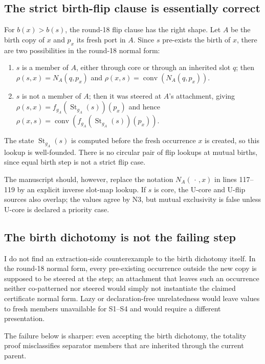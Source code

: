 \documentclass[11pt]{article}
\newcommand{\St}{\operatorname{St}}
\newcommand{\rhoR}{\rho}
\theoremstyle{remark}
\begin{document}
\subsection{The strict birth-flip clause is essentially correct}

For $b(x)>b(s)$, the round-18 flip clause has the right shape.  Let $A$ be the birth copy of $x$ and $p_x$ its fresh port in $A$.  Since $s$ pre-exists the birth of $x$, there are two possibilities in the round-18 normal form:
\begin{enumerate}[label=(\roman*)]
  \item $s$ is a member of $A$, either through core or through an inherited slot $q$; then $\rhoR(s,x)=N_A(q,p_x)$ and $\rhoR(x,s)=\operatorname{conv}(N_A(q,p_x))$.
  \item $s$ is not a member of $A$; then it was steered at $A$'s attachment, giving $\rhoR(s,x)=f_{g_A}(\St_{g_A}(s))(p_x)$ and hence $\rhoR(x,s)=\operatorname{conv}(f_{g_A}(\St_{g_A}(s))(p_x))$.
\end{enumerate}
The state $\St_{g_A}(s)$ is computed before the fresh occurrence $x$ is created, so this lookup is well-founded.  There is no circular pair of flip lookups at mutual births, since equal birth step is not a strict flip case.

The manuscript should, however, replace the notation $N_A(\,\cdot\,,x)$ in lines 117--119 by an explicit inverse slot-map lookup.  If $s$ is core, the U-core and U-flip sources also overlap; the values agree by N3, but mutual exclusivity is false unless U-core is declared a priority case.

\subsection{The birth dichotomy is not the failing step}

I do not find an extraction-side counterexample to the birth dichotomy itself.  In the round-18 normal form, every pre-existing occurrence outside the new copy is supposed to be steered at the step; an attachment that leaves such an occurrence neither co-patterned nor steered would simply not instantiate the claimed certificate normal form.  Lazy or declaration-free unrelatedness would leave values to fresh members unavailable for S1--S4 and would require a different presentation.

The failure below is sharper: even accepting the birth dichotomy, the totality proof misclassifies separator members that are inherited through the current parent.
\end{document}
